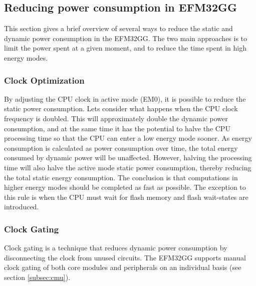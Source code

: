 %

\subsection{Reducing power consumption in EFM32GG}
This section gives a brief overview of several ways to reduce the static and dynamic power consumption in the EFM32GG. The two main approaches is to limit the power spent at a given moment, and to reduce the time spent in high energy modes.

\subsubsection{Clock Optimization}
By adjusting the CPU clock in active mode (EM0), it is possible to reduce the static power consumption. Lets consider what happens when the CPU clock frequency is doubled. This will approximately double the dynamic power consumption, and at the same time it has the potential to halve the CPU processing time so that the CPU can enter a low energy mode sooner. As energy consumption is calculated as power consumption over time, the total energy consumed by dynamic power will be unaffected. However, halving the processing time will also halve the active mode static power consumption, thereby reducing the total static energy consumption. The conclusion is that computations in higher energy modes should be completed as fast as possible. The exception to this rule is when the CPU must wait for flash memory and flash wait-states are introduced.\cite{efm32-energy-optimization}

\subsubsection{Clock Gating}
Clock gating is a technique that reduces dynamic power consumption by disconnecting the clock from unused circuits. The EFM32GG supports manual clock gating of both core modules and peripherals on an individual basis (see section \ref{subsec:cmu}).\cite{efm32-energy-optimization} 


